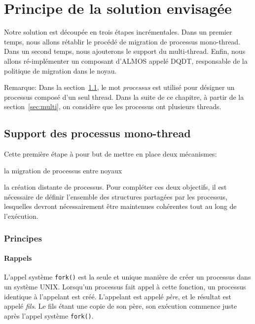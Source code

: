 \chapter{Principe de la solution envisagée}
\label{chap:sol}

  Notre solution est découpée en trois étapes incrémentales. Dans un premier
  temps, nous allons rétablir le procédé de migration de processus
  mono-thread. Dans un second temps, nous ajouterons le support du
  multi-thread. Enfin, nous allons ré-implémenter un composant d'ALMOS appelé
  DQDT, responsable de la politique de migration dans le noyau.

  \begin{paragraph}{Remarque:}
    Dans la section~\ref{sec:mono}, le mot \textit{processus} est utilisé pour
    désigner un processus composé d'un seul thread. Dans la suite de ce
    chapitre, à partir de la section~\ref{sec:multi}, on considère que les
    processus ont plusieurs threads.
  \end{paragraph}


  \section{Support des processus mono-thread}
  \label{sec:mono}

    Cette première étape à pour but de mettre en place deux mécanismes:
    \benumline \item la migration de processus entre noyaux \item la création
    distante de processus\eenumline. Pour compléter ces deux objectifs, il est
    nécessaire de définir l'ensemble des structures partagées par les processus,
    lesquelles devront nécessairement être maintenues cohérentes tout au long de
    l'exécution.

    \subsection{Principes}

      \subsubsection{Rappels}

        L'appel système \texttt{fork()} est la seule et unique manière de créer
        un processus dans un système UNIX. Lorsqu'un processus fait appel à
        cette fonction, un processus identique à l'appelant est créé. L'appelant
        est appelé \textit{père}, et le résultat est appelé \textit{fils}. Le
        fils étant une copie de son père, son exécution commence juste après
        l'appel système \texttt{fork()}.

